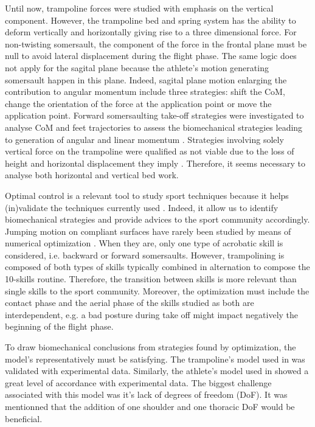Until now, trampoline forces were studied with emphasis on the vertical component.
However, the trampoline bed and spring system has the ability to deform vertically and horizontally giving rise to a three dimensional force.
For non-twisting somersault, the component of the force in the frontal plane must be null to avoid lateral displacement during the flight phase.
The same logic does not apply for the sagital plane because the athlete's motion generating somersault happen in this plane.
Indeed, sagital plane motion enlarging the contribution to angular momentum include three strategies: shift the CoM, change the orientation of the force at the application point or move the application point.
Forward somersaulting take-off strategies were investigated to analyse CoM and feet trajectories to assess the biomechanical strategies leading to generation of angular and linear momentum \cite{lephartatiner}.
Strategies involving solely vertical force on the trampoline were qualified as not viable due to the loss of height and horizontal displacement they imply \cite{lephartatiner}.
Therefore, it seems necessary to analyse both horizontal and vertical bed work.


Optimal control is a relevant tool to study sport techniques because it helps (in)validate the techniques currently used \cite{charbonneau2020optimal}.
Indeed, it allow us to identify biomechanical strategies and provide advices to the sport community accordingly.
Jumping motion on compliant surfaces have rarely been studied by means of numerical optimization \cite{cheng2008role, burke2015mechanics}.
When they are, only one type of acrobatic skill is considered, i.e. backward or forward somersaults.
However, trampolining is composed of both types of skills typically combined in alternation to compose the 10-skills routine. 
Therefore, the transition between skills is more relevant than single skills to the sport community.
Moreover, the optimization must include the contact phase and the aerial phase of the skills studied as both are interdependent, e.g. a bad posture during take off might impact negatively the beginning of the flight phase. 


To draw biomechanical conclusions from strategies found by optimization, the model's representatively must be satisfying.
The trampoline's model used in \cite{jacques2008determining} was validated with experimental data.
Similarly, the athlete's model used in \cite{burke2015mechanics} showed a great level of accordance with experimental data.
The biggest challenge associated with this model was it's lack of degrees of freedom (DoF).
It was mentionned that the addition of one shoulder and one thoracic DoF would be beneficial.


